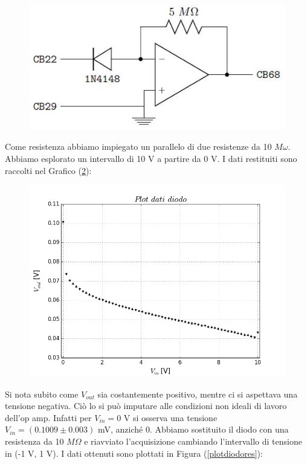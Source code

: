 \documentclass[journal, a4paper]{IEEEtran}
\begin{document}
\begin{figure}[htp]
\caption{}
\label{op-diod}
\centering
\includegraphics[scale=.4]{diodo}
\end{figure}

Come resistenza abbiamo impiegato un parallelo di due resistenze da 10 $M\omega$. Abbiamo esplorato un intervallo di 10 V a partire da 0 V. I dati restituiti sono raccolti nel Grafico (\ref{plotdiodosil}):\\

\begin{figure}[htp]
\caption{}
\label{plotdiodosil}
\centering
\includegraphics[scale=.35]{plotdiodosil}
\end{figure}

Si nota subito come $V_{out}$ sia costantemente positivo, mentre ci si aspettava una tensione negativa. Ciò lo si può imputare alle condizioni non ideali di lavoro dell'op amp. Infatti per $V_{in} = 0$ V si osserva una tensione $V_{in} = (0.1009 \pm 0.003)$ mV, anziché 0. Abbiamo sostituito il diodo con una resistenza da 10 $M\Omega$ e riavviato l'acquisizione cambiando l'intervallo di tensione in (-1 V, 1 V). I dati ottenuti sono plottati in Figura (\ref{plotdiodores}):\\
\end{document}

